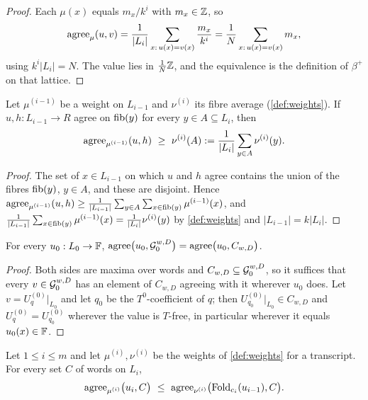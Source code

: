 \begin{proof}
Each $\mu(x)$ equals $m_x/k^i$ with $m_x\in\mathbb{Z}$, so
\[
\mathrm{agree}_\mu(u,v)=\frac1{|L_i|}\sum_{x:\,u(x)=v(x)}\frac{m_x}{k^i}=\frac1N\sum_{x:\,u(x)=v(x)}m_x,
\]
using $k^i|L_i|=N$. The value lies in $\frac1N\mathbb{Z}$, and the equivalence is the definition of
$\beta^+$ on that lattice.
\end{proof}

\begin{lemma}[Lifting]\label{lem:lift}
Let $\mu^{(i-1)}$ be a weight on $L_{i-1}$ and $\nu^{(i)}$ its fibre average
(\cref{def:weights}). If $u,h:L_{i-1}\to R$ agree on $\mathrm{fib}(y)$ for every $y\in A\subseteq L_i$,
then
\[
\agree_{\mu^{(i-1)}}(u,h)\ \ge\ \nu^{(i)}(A):=\frac1{|L_i|}\sum_{y\in A}\nu^{(i)}(y).
\]
\end{lemma}

\begin{proof}
The set of $x\in L_{i-1}$ on which $u$ and $h$ agree contains the union of the fibres $\mathrm{fib}(y)$,
$y\in A$, and these are disjoint. Hence
$\mathrm{agree}_{\mu^{(i-1)}}(u,h)\ge\frac1{|L_{i-1}|}\sum_{y\in A}\sum_{x\in\mathrm{fib}(y)}\mu^{(i-1)}(x)$, and
$\frac1{|L_{i-1}|}\sum_{x\in\mathrm{fib}(y)}\mu^{(i-1)}(x)=\frac1{|L_i|}\nu^{(i)}(y)$ by
\cref{def:weights} and $|L_{i-1}|=k|L_i|$.
\end{proof}

\begin{lemma}[Start]\label{lem:start}
For every $u_0:L_0\to\mathbb{F}$, $\mathrm{agree}\big(u_0,\mathcal{G}_0^{w,D}\big)=\mathrm{agree}\big(u_0,C_{w,D}\big)$.
\end{lemma}

\begin{proof}
Both sides are maxima over words and $C_{w,D}\subseteq\mathcal{G}_0^{w,D}$, so it suffices that every
$v\in\mathcal{G}_0^{w,D}$ has an element of $C_{w,D}$ agreeing with it wherever $u_0$ does. Let
$v=U^{(0)}_q|_{L_0}$ and let $q_0$ be the $T^0$-coefficient of $q$; then
$U^{(0)}_{q_0}|_{L_0}\in C_{w,D}$ and $U^{(0)}_q=U^{(0)}_{q_0}$ wherever the value is $T$-free, in
particular wherever it equals $u_0(x)\in\mathbb{F}$.
\end{proof}

\begin{lemma}[No increase]\label{lem:no-increase}
Let $1\le i\le m$ and let $\mu^{(i)},\nu^{(i)}$ be the weights of \cref{def:weights} for a
transcript. For every set $C$ of words on $L_i$,
\[
\agree_{\mu^{(i)}}\big(u_i,C\big)\ \le\ \agree_{\nu^{(i)}}\big(\Fold_{c_i}(u_{i-1}),C\big).
\]
\end{lemma}

